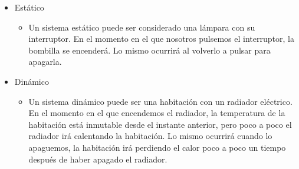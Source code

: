 \documentclass[12pt]{article}
\begin{document}
\begin{itemize}
    \item Estático
        \begin{itemize}
            \item Un sistema estático puede ser considerado una lámpara con su interruptor. En el
            momento en el que nosotros pulsemos el interruptor, la bombilla se encenderá. Lo mismo
            ocurrirá al volverlo a pulsar para apagarla.
        \end{itemize}
    \item Dinámico
        \begin{itemize}
            \item Un sistema dinámico puede ser una habitación con un radiador eléctrico. En el momento
            en el que encendemos el radiador, la temperatura de la habitación está inmutable desde
            el instante anterior, pero poco a poco el radiador irá calentando la habitación. Lo mismo
            ocurrirá cuando lo apaguemos, la habitación irá perdiendo el calor poco a poco un tiempo
            después de haber apagado el radiador.
        \end{itemize}
\end{itemize}
\newpage
\end{document}
